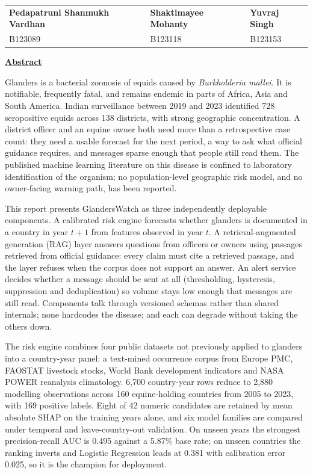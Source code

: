 \documentclass[10pt,openany]{report}
\begin{document}
\vspace{2.5cm}
\noindent
\noindent
\begin{tabular}{@{}p{5.75cm}p{4.35cm}p{4.35cm}@{}}
\textbf{Pedapatruni Shanmukh Vardhan} & \textbf{Shaktimayee Mohanty} & \textbf{Yuvraj Singh} \\[0.12em]
B123089 & B123118 & B123153 \\
\end{tabular}

\newpage
\pagestyle{plain}
\noindent\underline{\textbf{Abstract}}

\vspace{0.7cm}
\noindent
Glanders is a bacterial zoonosis of equids caused by \textit{Burkholderia mallei}. It is
notifiable, frequently fatal, and remains endemic in parts of Africa, Asia and South America.
Indian surveillance between 2019 and 2023 identified 728 seropositive equids across 138 districts,
with strong geographic concentration. A district officer and an equine owner both need more than a
retrospective case count: they need a usable forecast for the next period, a way to ask what official
guidance requires, and messages sparse enough that people still read them. The published machine
learning literature on this disease is confined to laboratory identification of the organism; no
population-level geographic risk model, and no owner-facing warning path, has been reported.

\vspace{0.5em}
\noindent
This report presents GlandersWatch as three independently deployable components. A calibrated risk
engine forecasts whether glanders is documented in a country in year $t{+}1$ from features observed
in year $t$. A retrieval-augmented generation (RAG) layer answers questions from officers or owners
using passages retrieved from official guidance: every claim must cite a retrieved passage, and the
layer refuses when the corpus does not support an answer. An alert service decides whether a message
should be sent at all (thresholding, hysteresis, suppression and deduplication) so volume stays low
enough that messages are still read. Components talk through versioned schemas rather than shared
internals; none hardcodes the disease; and each can degrade without taking the others down.

\vspace{0.5em}
\noindent
The risk engine combines four public datasets not previously applied to glanders into a country-year
panel: a text-mined occurrence corpus from Europe PMC, FAOSTAT livestock stocks, World Bank
development indicators and NASA POWER reanalysis climatology. 6,700 country-year rows reduce to
2,880 modelling observations across 160 equine-holding countries from 2005 to 2023, with
169 positive labels. Eight of 42 numeric candidates are retained by mean absolute SHAP on the
training years alone, and six model families are compared under temporal and leave-country-out
validation. On unseen years the strongest precision-recall AUC is 0.495 against a 5.87\% base rate;
on unseen countries the ranking inverts and Logistic Regression leads at 0.381 with calibration
error 0.025, so it is the champion for deployment.
\end{document}
